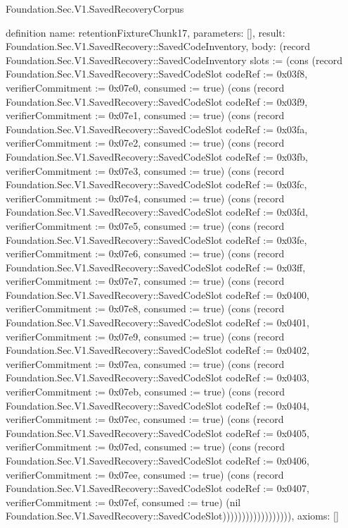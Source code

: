 \begin{lexlean}{Foundation.Sec.V1.SavedRecoveryCorpus}
\begin{semanticmodule}
definition{
  name: retentionFixtureChunk17,
  parameters: [],
  result: Foundation.Sec.V1.SavedRecovery::SavedCodeInventory,
  body: (record Foundation.Sec.V1.SavedRecovery::SavedCodeInventory {slots := (cons (record Foundation.Sec.V1.SavedRecovery::SavedCodeSlot {codeRef := 0x03f8, verifierCommitment := 0x07e0, consumed := true}) (cons (record Foundation.Sec.V1.SavedRecovery::SavedCodeSlot {codeRef := 0x03f9, verifierCommitment := 0x07e1, consumed := true}) (cons (record Foundation.Sec.V1.SavedRecovery::SavedCodeSlot {codeRef := 0x03fa, verifierCommitment := 0x07e2, consumed := true}) (cons (record Foundation.Sec.V1.SavedRecovery::SavedCodeSlot {codeRef := 0x03fb, verifierCommitment := 0x07e3, consumed := true}) (cons (record Foundation.Sec.V1.SavedRecovery::SavedCodeSlot {codeRef := 0x03fc, verifierCommitment := 0x07e4, consumed := true}) (cons (record Foundation.Sec.V1.SavedRecovery::SavedCodeSlot {codeRef := 0x03fd, verifierCommitment := 0x07e5, consumed := true}) (cons (record Foundation.Sec.V1.SavedRecovery::SavedCodeSlot {codeRef := 0x03fe, verifierCommitment := 0x07e6, consumed := true}) (cons (record Foundation.Sec.V1.SavedRecovery::SavedCodeSlot {codeRef := 0x03ff, verifierCommitment := 0x07e7, consumed := true}) (cons (record Foundation.Sec.V1.SavedRecovery::SavedCodeSlot {codeRef := 0x0400, verifierCommitment := 0x07e8, consumed := true}) (cons (record Foundation.Sec.V1.SavedRecovery::SavedCodeSlot {codeRef := 0x0401, verifierCommitment := 0x07e9, consumed := true}) (cons (record Foundation.Sec.V1.SavedRecovery::SavedCodeSlot {codeRef := 0x0402, verifierCommitment := 0x07ea, consumed := true}) (cons (record Foundation.Sec.V1.SavedRecovery::SavedCodeSlot {codeRef := 0x0403, verifierCommitment := 0x07eb, consumed := true}) (cons (record Foundation.Sec.V1.SavedRecovery::SavedCodeSlot {codeRef := 0x0404, verifierCommitment := 0x07ec, consumed := true}) (cons (record Foundation.Sec.V1.SavedRecovery::SavedCodeSlot {codeRef := 0x0405, verifierCommitment := 0x07ed, consumed := true}) (cons (record Foundation.Sec.V1.SavedRecovery::SavedCodeSlot {codeRef := 0x0406, verifierCommitment := 0x07ee, consumed := true}) (cons (record Foundation.Sec.V1.SavedRecovery::SavedCodeSlot {codeRef := 0x0407, verifierCommitment := 0x07ef, consumed := true}) (nil Foundation.Sec.V1.SavedRecovery::SavedCodeSlot)))))))))))))))))}),
  axioms: []
}


\end{semanticmodule}
\end{lexlean}
